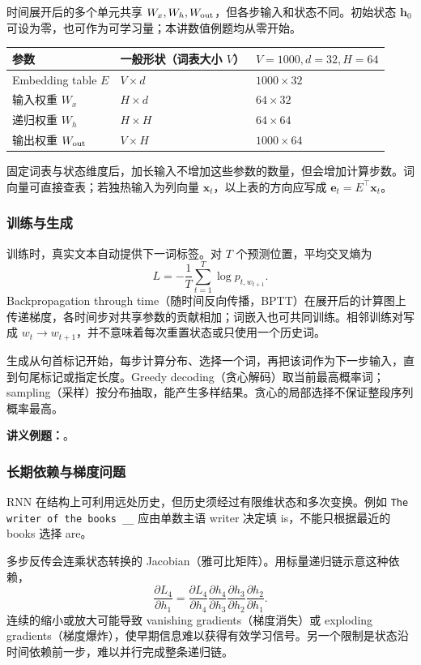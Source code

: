 时间展开后的多个单元共享 $W_x,W_h,W_{\rm out}$，但各步输入和状态不同。初始状态 $\mathbf h_0$ 可设为零，也可作为可学习量；本讲数值例题均从零开始。

\begin{center}
\small
\begin{tabular}{@{}lll@{}}
\toprule
参数 & 一般形状（词表大小 $V$） & $V=1000,d=32,H=64$ \\
\midrule
Embedding table $E$ & $V\times d$ & $1000\times32$ \\
输入权重 $W_x$ & $H\times d$ & $64\times32$ \\
递归权重 $W_h$ & $H\times H$ & $64\times64$ \\
输出权重 $W_{\rm out}$ & $V\times H$ & $1000\times64$ \\
\bottomrule
\end{tabular}
\end{center}
固定词表与状态维度后，加长输入不增加这些参数的数量，但会增加计算步数。词向量可直接查表；若独热输入为列向量 $\mathbf x_t$，以上表的方向应写成 $\mathbf e_t=E^\top\mathbf x_t$。

\subsubsection{训练与生成}

训练时，真实文本自动提供下一词标签。对 $T$ 个预测位置，平均交叉熵为
\[
 L=-\frac1T\sum_{t=1}^{T}\log p_{t,w_{t+1}}.
\]
Backpropagation through time（随时间反向传播，BPTT）在展开后的计算图上传递梯度，各时间步对共享参数的贡献相加；词嵌入也可共同训练。相邻训练对写成 $w_t\to w_{t+1}$，并不意味着每次重置状态或只使用一个历史词。

生成从句首标记开始，每步计算分布、选择一个词，再把该词作为下一步输入，直到句尾标记或指定长度。Greedy decoding（贪心解码）取当前最高概率词；sampling（采样）按分布抽取，能产生多样结果。贪心的局部选择不保证整段序列概率最高。

\textbf{讲义例题：}。

\subsubsection{长期依赖与梯度问题}

RNN 在结构上可利用远处历史，但历史须经过有限维状态和多次变换。例如 \texttt{The writer of the books \_\_} 应由单数主语 writer 决定填 is，不能只根据最近的 books 选择 are。

多步反传会连乘状态转换的 Jacobian（雅可比矩阵）。用标量递归链示意这种依赖，
\[
 \frac{\partial L_4}{\partial h_1}
 =\frac{\partial L_4}{\partial h_4}
  \frac{\partial h_4}{\partial h_3}
  \frac{\partial h_3}{\partial h_2}
  \frac{\partial h_2}{\partial h_1}.
\]
连续的缩小或放大可能导致 vanishing gradients（梯度消失）或 exploding gradients（梯度爆炸），使早期信息难以获得有效学习信号。另一个限制是状态沿时间依赖前一步，难以并行完成整条递归链。

